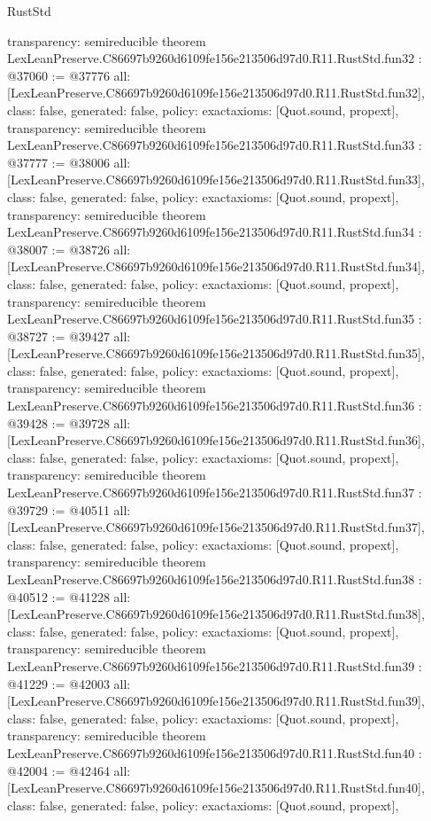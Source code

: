 \begin{lexlean}{RustStd}
\begin{coremodule}
{  transparency: semireducible
}
theorem LexLeanPreserve.C86697b9260d6109fe156e213506d97d0.R11.RustStd.fun32 : @37060 := @37776 {
  all: [LexLeanPreserve.C86697b9260d6109fe156e213506d97d0.R11.RustStd.fun32],
  class: false,
  generated: false,
  policy: exact{axioms: [Quot.sound, propext]},
  transparency: semireducible
}
theorem LexLeanPreserve.C86697b9260d6109fe156e213506d97d0.R11.RustStd.fun33 : @37777 := @38006 {
  all: [LexLeanPreserve.C86697b9260d6109fe156e213506d97d0.R11.RustStd.fun33],
  class: false,
  generated: false,
  policy: exact{axioms: [Quot.sound, propext]},
  transparency: semireducible
}
theorem LexLeanPreserve.C86697b9260d6109fe156e213506d97d0.R11.RustStd.fun34 : @38007 := @38726 {
  all: [LexLeanPreserve.C86697b9260d6109fe156e213506d97d0.R11.RustStd.fun34],
  class: false,
  generated: false,
  policy: exact{axioms: [Quot.sound, propext]},
  transparency: semireducible
}
theorem LexLeanPreserve.C86697b9260d6109fe156e213506d97d0.R11.RustStd.fun35 : @38727 := @39427 {
  all: [LexLeanPreserve.C86697b9260d6109fe156e213506d97d0.R11.RustStd.fun35],
  class: false,
  generated: false,
  policy: exact{axioms: [Quot.sound, propext]},
  transparency: semireducible
}
theorem LexLeanPreserve.C86697b9260d6109fe156e213506d97d0.R11.RustStd.fun36 : @39428 := @39728 {
  all: [LexLeanPreserve.C86697b9260d6109fe156e213506d97d0.R11.RustStd.fun36],
  class: false,
  generated: false,
  policy: exact{axioms: [Quot.sound, propext]},
  transparency: semireducible
}
theorem LexLeanPreserve.C86697b9260d6109fe156e213506d97d0.R11.RustStd.fun37 : @39729 := @40511 {
  all: [LexLeanPreserve.C86697b9260d6109fe156e213506d97d0.R11.RustStd.fun37],
  class: false,
  generated: false,
  policy: exact{axioms: [Quot.sound, propext]},
  transparency: semireducible
}
theorem LexLeanPreserve.C86697b9260d6109fe156e213506d97d0.R11.RustStd.fun38 : @40512 := @41228 {
  all: [LexLeanPreserve.C86697b9260d6109fe156e213506d97d0.R11.RustStd.fun38],
  class: false,
  generated: false,
  policy: exact{axioms: [Quot.sound, propext]},
  transparency: semireducible
}
theorem LexLeanPreserve.C86697b9260d6109fe156e213506d97d0.R11.RustStd.fun39 : @41229 := @42003 {
  all: [LexLeanPreserve.C86697b9260d6109fe156e213506d97d0.R11.RustStd.fun39],
  class: false,
  generated: false,
  policy: exact{axioms: [Quot.sound, propext]},
  transparency: semireducible
}
theorem LexLeanPreserve.C86697b9260d6109fe156e213506d97d0.R11.RustStd.fun40 : @42004 := @42464 {
  all: [LexLeanPreserve.C86697b9260d6109fe156e213506d97d0.R11.RustStd.fun40],
  class: false,
  generated: false,
  policy: exact{axioms: [Quot.sound, propext]},
}
\end{coremodule}
\end{lexlean}
